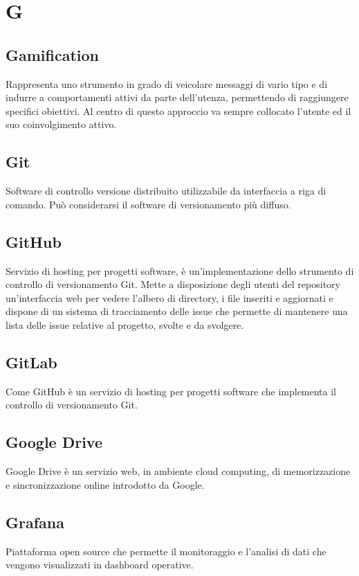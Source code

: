 \section*{G}

\subsection{Gamification}
Rappresenta uno strumento in grado di veicolare messaggi di vario tipo e di indurre a comportamenti attivi da parte dell’utenza, permettendo di raggiungere specifici obiettivi. Al centro di questo approccio va sempre collocato l'utente ed il suo coinvolgimento attivo.

\subsection{Git}
Software di controllo versione distribuito utilizzabile da interfaccia a riga di comando. Può considerarsi il software di versionamento più diffuso.

\subsection{GitHub}
Servizio di hosting per progetti software, è un'implementazione dello strumento di controllo di versionamento Git. Mette a disposizione degli utenti del repository un'interfaccia web per vedere l'albero di directory, i file inseriti e aggiornati e dispone di un sistema di tracciamento delle issue che permette di mantenere una lista delle issue relative al progetto, svolte e da svolgere.

\subsection{GitLab}
Come GitHub è un servizio di hosting per progetti software che implementa il controllo di versionamento Git. 

\subsection{Google Drive}
Google Drive è un servizio web, in ambiente cloud computing, di memorizzazione e sincronizzazione online introdotto da Google.

\subsection{Grafana}
Piattaforma open source che permette il monitoraggio e l'analisi di dati che vengono visualizzati in dashboard operative. 